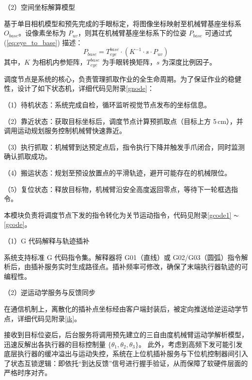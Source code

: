 （2）空间坐标解算模型

基于单目相机模型和预先完成的手眼标定，将图像坐标映射至机械臂基座坐标系 $O_{base}$。设像素坐标为 $P_{uv}$，则其在机械臂基座坐标系下的位姿 $P_{base}$ 可通过式 (\ref{eq:eye_to_base}) 描述：
\begin{equation}
\label{eq:eye_to_base}
P_{base} = T_{eye}^{base} \cdot (K^{-1} \cdot s \cdot P_{uv})
\end{equation}
其中，$K$ 为相机内参矩阵，$T_{eye}^{base}$ 为手眼转换矩阵，$s$ 为深度比例因子。


调度节点是系统的核心，负责管理抓取作业的全生命周期。为了保证作业的稳健性，设计了如下状态机，详细代码见附录\ref{gnode}：

（1）待机状态：系统完成自检，循环监听视觉节点发布的坐标信息。

（2）靠近状态：获取目标坐标后，调度节点计算预抓取点（目标上方 5\,cm），并调用运动规划服务控制机械臂快速靠近。

（3）执行抓取：机械臂到达预定点后，指令执行下降并触发手爪闭合，同时监测确认抓取成功。

（4）搬运状态：规划至预设放置点的平滑轨迹，避开可能存在的机械限位。

（5）复位状态：释放目标物，机械臂沿安全高度返回零点，等待下一轮框选指令。



本模块负责将调度节点下发的指令转化为关节运动指令，代码见附录\ref{gcode1} $ \thicksim $ \ref{gcode}。

（1）G 代码解释与轨迹插补

系统支持标准 G 代码指令集。解释器将 G01（直线）或 G02/G03（圆弧）指令解析后，由插补服务实时生成路径点。插补频率可修改，确保了末端执行器轨迹的可编程性。

（2）逆运动学服务与反馈同步

在通信机制上，离散化的插补点坐标经由客户端封装后，被定向推送给逆运动学节点，详细代码见附录\ref{ik}。

接收到目标位姿后，后台服务将调用预先建立的三自由度机械臂运动学解析模型，迅速反解出各执行器的目标控制量 $\{\theta_1, \theta_2, \theta_3\}$。
此外，考虑到高频下发可能引发底层执行器的缓冲溢出与运动失控，系统在上位机插补服务与下位机控制器间引入了状态互锁逻辑：即依托“到达反馈”信号进行握手验证，从而保障了软硬件层面的严格时序对齐。

